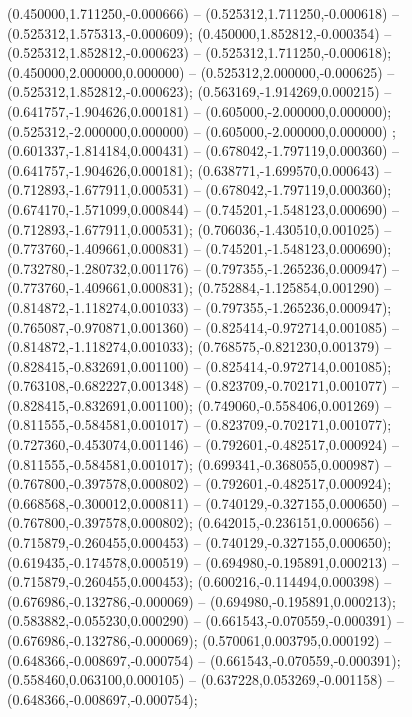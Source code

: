  (0.450000,1.711250,-0.000666) -- (0.525312,1.711250,-0.000618) -- (0.525312,1.575313,-0.000609);
 (0.450000,1.852812,-0.000354) -- (0.525312,1.852812,-0.000623) -- (0.525312,1.711250,-0.000618);
 (0.450000,2.000000,0.000000) -- (0.525312,2.000000,-0.000625) -- (0.525312,1.852812,-0.000623);
 (0.563169,-1.914269,0.000215) -- (0.641757,-1.904626,0.000181) -- (0.605000,-2.000000,0.000000);
 (0.525312,-2.000000,0.000000) -- (0.605000,-2.000000,0.000000) ;
 (0.601337,-1.814184,0.000431) -- (0.678042,-1.797119,0.000360) -- (0.641757,-1.904626,0.000181);
 (0.638771,-1.699570,0.000643) -- (0.712893,-1.677911,0.000531) -- (0.678042,-1.797119,0.000360);
 (0.674170,-1.571099,0.000844) -- (0.745201,-1.548123,0.000690) -- (0.712893,-1.677911,0.000531);
 (0.706036,-1.430510,0.001025) -- (0.773760,-1.409661,0.000831) -- (0.745201,-1.548123,0.000690);
 (0.732780,-1.280732,0.001176) -- (0.797355,-1.265236,0.000947) -- (0.773760,-1.409661,0.000831);
 (0.752884,-1.125854,0.001290) -- (0.814872,-1.118274,0.001033) -- (0.797355,-1.265236,0.000947);
 (0.765087,-0.970871,0.001360) -- (0.825414,-0.972714,0.001085) -- (0.814872,-1.118274,0.001033);
 (0.768575,-0.821230,0.001379) -- (0.828415,-0.832691,0.001100) -- (0.825414,-0.972714,0.001085);
 (0.763108,-0.682227,0.001348) -- (0.823709,-0.702171,0.001077) -- (0.828415,-0.832691,0.001100);
 (0.749060,-0.558406,0.001269) -- (0.811555,-0.584581,0.001017) -- (0.823709,-0.702171,0.001077);
 (0.727360,-0.453074,0.001146) -- (0.792601,-0.482517,0.000924) -- (0.811555,-0.584581,0.001017);
 (0.699341,-0.368055,0.000987) -- (0.767800,-0.397578,0.000802) -- (0.792601,-0.482517,0.000924);
 (0.668568,-0.300012,0.000811) -- (0.740129,-0.327155,0.000650) -- (0.767800,-0.397578,0.000802);
 (0.642015,-0.236151,0.000656) -- (0.715879,-0.260455,0.000453) -- (0.740129,-0.327155,0.000650);
 (0.619435,-0.174578,0.000519) -- (0.694980,-0.195891,0.000213) -- (0.715879,-0.260455,0.000453);
 (0.600216,-0.114494,0.000398) -- (0.676986,-0.132786,-0.000069) -- (0.694980,-0.195891,0.000213);
 (0.583882,-0.055230,0.000290) -- (0.661543,-0.070559,-0.000391) -- (0.676986,-0.132786,-0.000069);
 (0.570061,0.003795,0.000192) -- (0.648366,-0.008697,-0.000754) -- (0.661543,-0.070559,-0.000391);
 (0.558460,0.063100,0.000105) -- (0.637228,0.053269,-0.001158) -- (0.648366,-0.008697,-0.000754);
